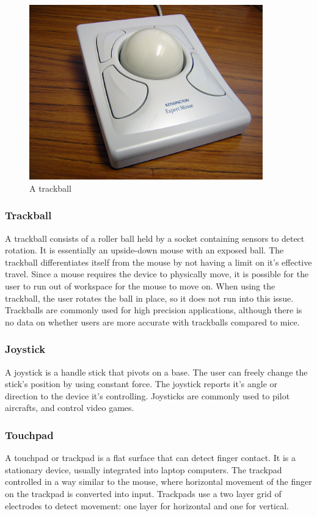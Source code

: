 \documentclass[11pt]{report}
\begin{document}
 \begin{figure}
 \includegraphics[width=0.9\textwidth]{trackball}
 \caption{A trackball}
 \end{figure}
 
 \subsubsection{Trackball}
 
 A trackball consists of a roller ball held by a socket containing sensors to detect rotation.
 It is essentially an upside-down mouse with an exposed ball.
 The trackball differentiates itself from the mouse by not having a limit on it's effective travel.
 Since a mouse requires the device to physically move, it is possible for the user to run out of workspace for the mouse to move on.
 When using the trackball, the user rotates the ball in place, so it does not run into this issue.
 Trackballs are commonly used for high precision applications, although there is no data on whether users are more accurate with trackballs compared to mice.
 
 \subsubsection{Joystick}
 
 A joystick is a handle stick that pivots on a base. 
 The user can freely change the stick's position by using constant force.
 The joystick reports it's angle or direction to the device it's controlling.
 Joysticks are commonly used to pilot aircrafts, and control video games. 
 
 
 \subsubsection{Touchpad}
 A touchpad or trackpad is a flat surface that can detect finger contact. 
 It is a stationary device, usually integrated into laptop computers. The trackpad controlled in a way similar to the mouse, where horizontal movement of the finger on the trackpad is converted into input. 
 Trackpads use a two layer grid of electrodes to detect movement: one layer for horizontal and one for vertical.
 
\end{document}
